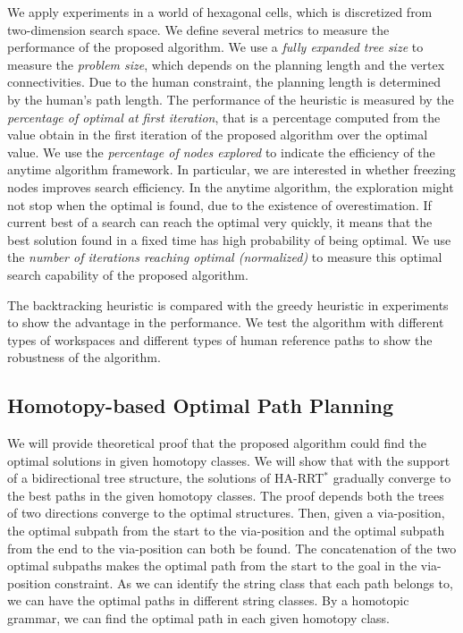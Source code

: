 \documentclass[phd]{byuprop}
\begin{document}
We apply experiments in a world of hexagonal cells, which is discretized from two-dimension search space.
We define several metrics to measure the performance of the proposed algorithm.
We use a \emph{fully expanded tree size} to measure the \emph{problem size}, which depends on the planning length and the vertex connectivities.
Due to the human constraint, the planning length is determined by the human's path length.
The performance of the heuristic is measured by the \emph{percentage of optimal at first iteration}, that is a percentage computed from the value obtain in the first iteration of the proposed algorithm over the optimal value.
We use the \emph{percentage of nodes explored} to indicate the efficiency of the anytime algorithm framework.
In particular, we are interested in whether freezing nodes improves search efficiency.
In the anytime algorithm, the exploration might not stop when the optimal is found, due to the existence of overestimation.
If current best of a search can reach the optimal very quickly, it means that the best solution found in a fixed time has high probability of being optimal.
We use the \emph{number of iterations reaching optimal (normalized)} to measure this optimal search capability of the proposed algorithm.

The backtracking heuristic is compared with the greedy heuristic in experiments to show the advantage in the performance.
We test the algorithm with different types of workspaces and different types of human reference paths to show the robustness of the algorithm.


\subsection{Homotopy-based Optimal Path Planning}
\label{sec:validation:homotopy_based_optimal_path_planning}

We will provide theoretical proof that the proposed algorithm could find the optimal solutions in given homotopy classes.
We will show that with the support of a bidirectional tree structure, the solutions of HA-RRT$^{*}$ gradually converge to the best paths in the given homotopy classes.
The proof depends both the trees of two directions converge to the optimal structures.
Then, given a via-position, the optimal subpath from the start to the via-position and the optimal subpath from the end to the via-position can both be found.
The concatenation of the two optimal subpaths makes the optimal path from the start to the goal in the via-position constraint.
As we can identify the string class that each path belongs to, we can have the optimal paths in different string classes.
By a homotopic grammar, we can find the optimal path in each given homotopy class.
\end{document}
